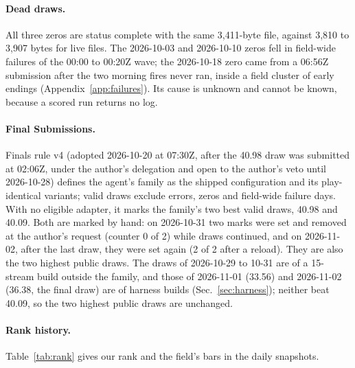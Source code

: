 \paragraph{Dead draws.}
All three zeros are status complete with the same 3,411-byte file, against 3,810 to 3,907 bytes for live files. %
The 2026-10-03 and 2026-10-10 zeros fell in field-wide failures of the 00:00 to 00:20Z wave; the 2026-10-18 zero came from a 06:56Z submission after the two morning fires never ran, inside a field cluster of early endings (Appendix~\ref{app:failures}). %
Its cause is unknown and cannot be known, because a scored run returns no log. %

\paragraph{Final Submissions.}
Finals rule v4 (adopted 2026-10-20 at 07:30Z, after the 40.98 draw was submitted at 02:06Z, under the author's delegation and open to the author's veto until 2026-10-28) defines the agent's family as the shipped configuration and its play-identical variants; valid draws exclude errors, zeros and field-wide failure days. %
With no eligible adapter, it marks the family's two best valid draws, 40.98 and 40.09. %
Both are marked by hand: on 2026-10-31 two marks were set and removed at the author's request (counter 0 of 2) while draws continued, and on 2026-11-02, after the last draw, they were set again (2 of 2 after a reload). They are also the two highest public draws. %
The draws of 2026-10-29 to 10-31 are of a 15-stream build outside the family, and those of 2026-11-01 (33.56) and 2026-11-02 (36.38, the final draw) are of harness builds (Sec.~\ref{sec:harness}); neither beat 40.09, so the two highest public draws are unchanged. %

\ifanon\else
\paragraph{Rank history.}
Table~\ref{tab:rank} gives our rank and the field's bars in the daily snapshots. %


